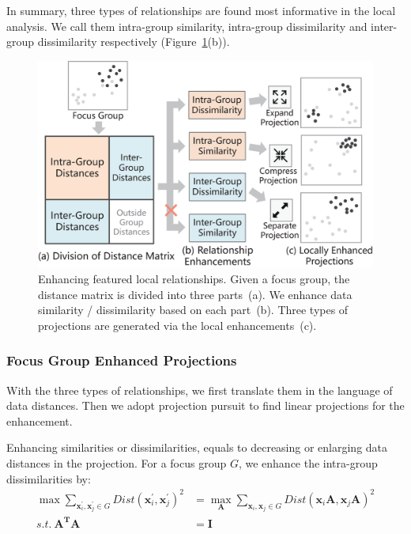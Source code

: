 In summary, three types of relationships are found most informative in the local analysis. We call them intra-group similarity, intra-group dissimilarity and inter-group dissimilarity respectively (Figure~\ref{fig:local_relationships}(b)).

\begin{figure}[htbp]
\centering
\includegraphics[width=1\linewidth]{images/enhancement1.eps}
  \caption{Enhancing featured local relationships. Given a focus group, the distance matrix is divided into three parts~(a). We enhance data similarity / dissimilarity based on each part~(b). Three types of projections are generated via the local enhancements~(c).}
\label{fig:local_relationships}
  \end{figure}

\subsubsection{Focus Group Enhanced Projections}
\label{subsubsection:relationship_enhancement}
With the three types of relationships, we first translate them in the language of data distances. Then we adopt projection pursuit to find linear projections for the enhancement.

Enhancing similarities or dissimilarities, equals to decreasing or enlarging data distances in the projection. For a focus group $G$, we enhance the intra-group dissimilarities by:
\begin{equation}
\begin{split}
\max \sum\limits_{\mathbf{x}_{i}^{\prime}, \mathbf{x}_{j}^{\prime} \in G} Dist(\mathbf{x}_{i}^{\prime}, \mathbf{x}_{j}^{\prime})^{2} &= \max_{\mathbf{A}} \sum\limits_{\mathbf{x}_{i}, \mathbf{x}_{j} \in G} Dist(\mathbf{x}_{i}\mathbf{A}, \mathbf{x}_{j}\mathbf{A})^{2}\\ 
s.t.\ \mathbf{A^{T}A} &= \mathbf{I}
\end{split}
\end{equation}
  
